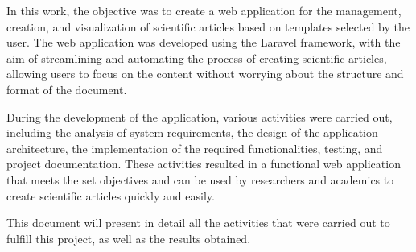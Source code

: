 In this work, the objective was to create a web application for the management, creation, and visualization of scientific articles based on templates selected by the user. The web application was developed using the Laravel framework, with the aim of streamlining and automating the process of creating scientific articles, allowing users to focus on the content without worrying about the structure and format of the document.

During the development of the application, various activities were carried out, including the analysis of system requirements, the design of the application architecture, the implementation of the required functionalities, testing, and project documentation. These activities resulted in a functional web application that meets the set objectives and can be used by researchers and academics to create scientific articles quickly and easily.

This document will present in detail all the activities that were carried out to fulfill this project, as well as the results obtained.